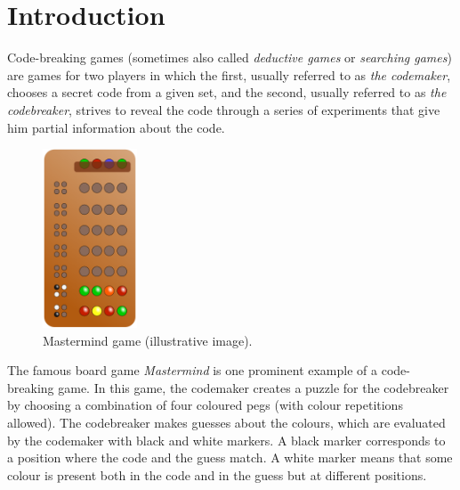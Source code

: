  \chapter{Introduction}


Code-breaking games (sometimes also called \emph{deductive games} or \emph{searching games})
  are games for two players in which the first,
  usually referred to as \emph{the codemaker},
    chooses a secret code from a given set, and the second,
  usually referred to as \emph{the codebreaker},
    strives to reveal the code through a series
    of experiments that give him partial information about the code.

\begin{figure}
  \vspace{-5mm}
  \begin{center}
  \includegraphics[width=0.25\textwidth]{pictures/mastermind.png}
  \vspace{-5mm}
  \end{center}
  \caption{Mastermind game (illustrative image)\protect\footnotemark.}
  \vspace{-5mm}
\end{figure}

The famous board game \emph{Mastermind} is one prominent example
  of a code-breaking game.
In this game, the codemaker creates a puzzle for the codebreaker by choosing a
  combination of four coloured pegs (with colour repetitions allowed).
The codebreaker makes guesses about the colours, which are evaluated by the codemaker with
  black and white markers.
A black marker corresponds to a position where the code and the guess match.
A white marker means that some colour is present both in the code
  and in the guess but at different positions.


